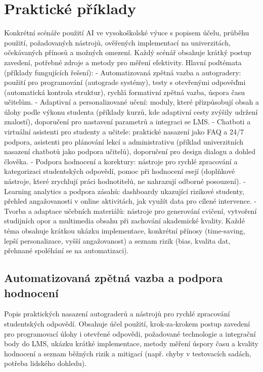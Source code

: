 \documentclass{report}%
\begin{document}
%
\chapter{Praktické příklady}%
Konkrétní scénáře použití AI ve vysokoškolské výuce s popisem účelu, průběhu použití, požadovaných nástrojů, ověřených implementací na univerzitách, očekávaných přínosů a možných omezení. Každý scénář obsahuje krátký postup zavedení, potřebné zdroje a metody pro měření efektivity.
Hlavní podtémata (příklady fungujících řešení):
- Automatizovaná zpětná vazba a autogradery: použití pro programování (autograde systémy), testy s otevřenými odpověďmi (automatická kontrola struktur), rychlá formativní zpětná vazba, úspora času učitelům.
- Adaptivní a personalizované učení: moduly, které přizpůsobují obsah a úlohy podle výkonu studenta (příklady kurzů, kde adaptivní cesty zvýšily udržení znalostí), doporučení pro nastavení parametrů a integraci se LMS.
- Chatboti a virtuální asistenti pro studenty a učitele: praktické nasazení jako FAQ a 24/7 podpora, asistenti pro plánování lekcí a administrativu (příklad univerzitních nasazení chatbotů jako podpora učitelů), doporučení pro design dialogu a dohled člověka.
- Podpora hodnocení a korektury: nástroje pro rychlé zpracování a kategorizaci studentských odpovědí, pomoc při hodnocení esejí (doplňkové nástroje, které zrychlují práci hodnotitelů, ne nahrazují odborné posouzení).
- Learning analytics a podpora zásahů: dashboardy ukazující rizikové studenty, přehled angažovanosti v online aktivitách, jak využít data pro cílené intervence.
- Tvorba a adaptace učebních materiálů: nástroje pro generování cvičení, vytvoření studijních opor a multimedia obsahu při zachování akademické kvality.
Každé téma obsahuje krátkou ukázku implementace, konkrétní přínosy (time‑saving, lepší personalizace, vyšší angažovanost) a seznam rizik (bias, kvalita dat, přehnané spoléhání se na automatizaci).%
\section{Automatizovaná zpětná vazba a podpora hodnocení}%
Popis praktických nasazení autograderů a nástrojů pro rychlé zpracování studentských odpovědí. Obsahuje účel použití, krok‑za‑krokem postup zavedení pro programovací úlohy i otevřené odpovědi, požadované technologie a integrační body do LMS, ukázku krátké implementace, metody měření úspory času a kvality hodnocení a seznam běžných rizik a mitigací (např. chyby v testovacích sadách, potřeba lidského dohledu).%
\end{document}
